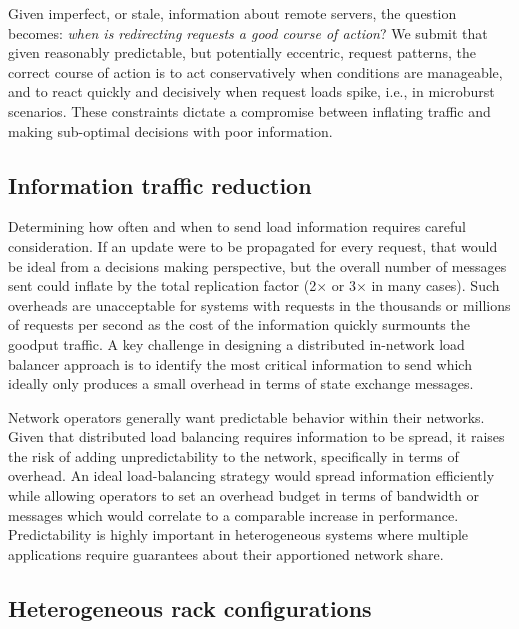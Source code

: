 Given imperfect, or stale, information about remote servers, the
question becomes: \textit{when is redirecting requests a good course of action}? 
%  
We submit that given reasonably predictable, but
potentially eccentric, request patterns, the correct course of action
is to act conservatively when conditions are manageable, and to react
quickly and decisively when request loads spike, i.e., in microburst
scenarios.  
%
These constraints dictate a compromise between inflating traffic and making sub-optimal decisions with poor information.

\subsection{Information traffic reduction} 

Determining how often and when to send load information requires
careful consideration. If an update were to be propagated for every
request, that would be ideal from a decisions making perspective, but
the overall number of messages sent could inflate by the total
replication factor (2$\times$ or 3$\times$ in many cases).  Such
overheads are unacceptable for systems with requests in the thousands
or millions of requests per second as the cost of the information
quickly surmounts the goodput traffic. A key challenge in designing a
distributed in-network load balancer approach is to identify the most
critical information to send which ideally only produces a small
overhead in terms of state exchange messages.


Network operators generally want predictable behavior within their networks.
Given that distributed load balancing requires information to be spread, it
raises the risk of adding unpredictability to the network, specifically in
terms of overhead. An ideal load-balancing strategy would spread information
efficiently while allowing operators to set an overhead budget in terms of
bandwidth or messages which would correlate to a comparable increase in
performance. Predictability is highly important in heterogeneous systems where
multiple applications require guarantees about their apportioned network share.

\subsection{Heterogeneous rack configurations}

